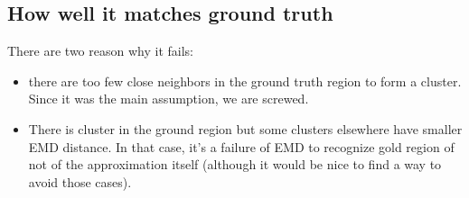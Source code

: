 \subsection{How well it matches ground truth}

There are two reason why it fails:
\begin{itemize}
	\item there are too few close neighbors in the ground truth region to form
		a cluster. Since it was the main assumption, we are screwed.
	\item There is cluster in the ground region but some clusters elsewhere
		have smaller EMD distance. In that case, it's a failure of EMD to
		recognize gold region of not of the approximation itself (although it
		would be nice to find a way to avoid those cases).
\end{itemize}
